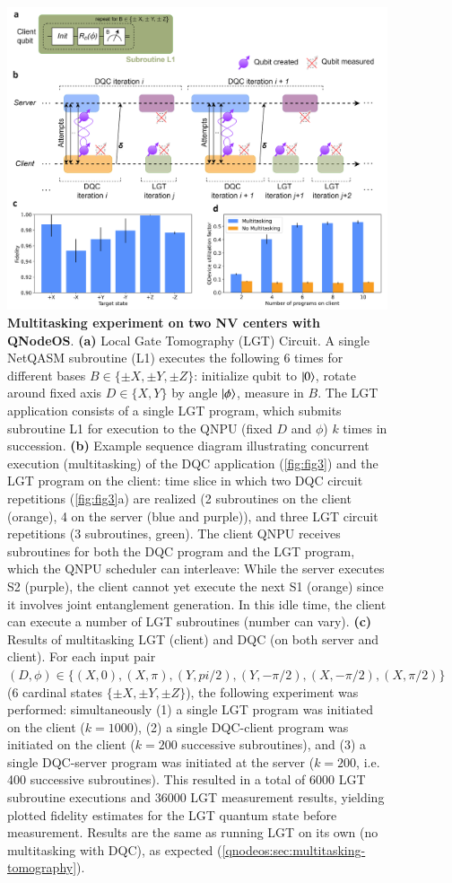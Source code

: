 \begin{figure}[htbp]
\centering
\includegraphics[width=0.95\linewidth]{figures/qnodeos/main/fig4/fig4.png}
\caption{\textbf{Multitasking experiment on two NV centers with QNodeOS}.
\textbf{(a)} Local Gate Tomography (LGT) Circuit. A single NetQASM subroutine (L1) executes the following 6 times for different bases $B \in \{\pm X, \pm Y, \pm Z\}$: initialize qubit to $\ket{0}$, rotate around fixed axis $D \in \{X,Y\}$ by angle $\ket{\phi}$, measure in $B$. The LGT application consists of a single LGT program, which submits subroutine L1 for execution to the QNPU (fixed $D$ and $\phi$) $k$ times in succession.
\textbf{(b)} Example sequence diagram illustrating concurrent execution (multitasking) of the DQC application (\cref{fig:fig3}) and the LGT program on the client: time slice in which two DQC circuit repetitions (\cref{fig:fig3}a) are realized (2 subroutines on the client (orange), 4 on the server (blue and purple)), and three LGT circuit repetitions (3 subroutines, green). The client QNPU receives subroutines for both the DQC program and the LGT program, which the QNPU scheduler can interleave: While the server executes S2 (purple), the client cannot yet execute the next S1 (orange) since it involves joint entanglement generation. In this idle time, the client can execute a number of LGT subroutines (number can vary).
\textbf{(c)} Results of multitasking LGT (client) and DQC (on both server and client). For each input pair $(D, \phi) \in \{ (X,0), (X,\pi), (Y,pi/2), (Y,-\pi/2), (X,-\pi/2), (X,\pi/2) \}$ (6 cardinal states $\{\pm X, \pm Y, \pm Z\}$), the following experiment was performed: simultaneously (1) a single LGT program was initiated on the client ($k=1000$), (2) a single DQC-client program was initiated on the client ($k=200$ successive subroutines), and (3) a single DQC-server program was initiated at the server ($k=200$, i.e. 400 successive subroutines). This resulted in a total of 6000 LGT subroutine executions and 36000 LGT measurement results, yielding plotted fidelity estimates for the LGT quantum state before measurement. Results are the same as running LGT on its own (no multitasking with DQC), as expected (\cref{qnodeos:sec:multitasking-tomography}).
}
\end{figure}
